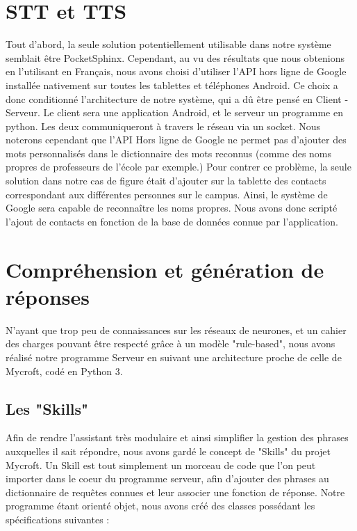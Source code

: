 \documentclass[a4paper,10pt]{report}
\begin{document}
      \section{STT et TTS}
      {Tout d'abord, la seule solution potentiellement utilisable dans notre système semblait être PocketSphinx. Cependant, au vu des résultats que nous obtenions en l'utilisant en Français, nous avons choisi d'utiliser l'API hors ligne de Google installée nativement sur toutes les tablettes et téléphones Android. \newline}
      {Ce choix a donc conditionné l'architecture de notre système, qui a dû être pensé en Client - Serveur. Le client sera une application Android, et le serveur un programme en python. Les deux communiqueront à travers le réseau via un socket.\newline}
      {Nous noterons cependant que l'API Hors ligne de Google ne permet pas d'ajouter des mots personnalisés dans le dictionnaire des mots reconnus (comme des noms propres de professeurs de l'école par exemple.) Pour contrer ce problème, la seule solution dans notre cas de figure était d'ajouter sur la tablette des contacts correspondant aux différentes personnes sur le campus. Ainsi, le système de Google sera capable de reconnaître les noms propres. Nous avons donc scripté l'ajout de contacts en fonction de la base de données connue par l'application.}
      \section{Compréhension et génération de réponses}
      {N'ayant que trop peu de connaissances sur les réseaux de neurones, et un cahier des charges pouvant être respecté grâce à un modèle "rule-based", nous avons réalisé notre programme Serveur en suivant une architecture proche de celle de Mycroft, codé en Python 3.}
        \subsection{Les "Skills"}
        {Afin de rendre l'assistant très modulaire et ainsi simplifier la gestion des phrases auxquelles il sait répondre, nous avons gardé le concept de "Skills" du projet Mycroft. Un Skill est tout simplement un morceau de code que l'on peut importer dans le coeur du programme serveur, afin d'ajouter des phrases au dictionnaire de requêtes connues et leur associer une fonction de réponse.\newline}
        {Notre programme étant orienté objet, nous avons créé des classes possédant les spécifications suivantes :\newline\newline}
\end{document}
